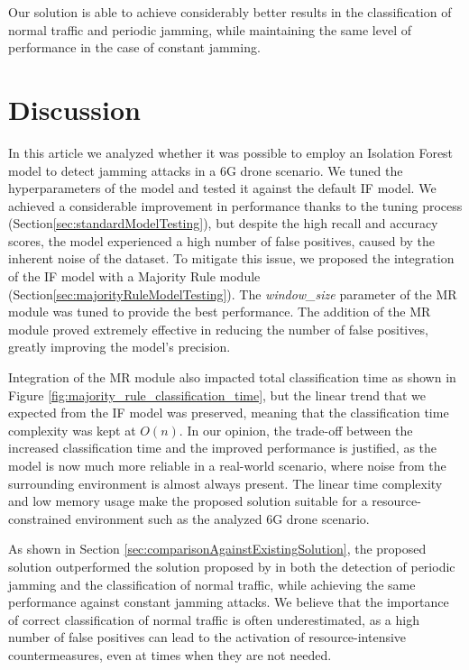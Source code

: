 \documentclass[futureinternet,article,submit,pdftex,moreauthors]{Definitions/mdpi}
\begin{document}
Our solution is able to achieve considerably better results in the classification of normal traffic and periodic jamming, while maintaining the same level of performance in the case of constant jamming.

\section{Discussion}


In this article we analyzed whether it was possible to employ an Isolation Forest model to detect jamming attacks in a 6G drone scenario. We tuned the hyperparameters of the model and tested it against the default IF model. 
We achieved a considerable improvement in performance thanks to the tuning process (Section\ref{sec:standardModelTesting}), but despite the high recall and accuracy scores, the model experienced a high number of false positives, caused by the inherent noise of the dataset. 
To mitigate this issue, we proposed the integration of the IF model with a Majority Rule module (Section\ref{sec:majorityRuleModelTesting}). The \textit{window\_size} parameter of the MR module was tuned to provide the best performance.
The addition of the MR module proved extremely effective in reducing the number of false positives, greatly improving the model's precision. 

Integration of the MR module also impacted total classification time as shown in Figure \ref{fig:majority_rule_classification_time}, but the linear trend \cite{IsolationForestLiu} that we expected from the IF model was preserved, meaning that the classification time complexity was kept at $O(n)$. 
In our opinion, the trade-off between the increased classification time and the improved performance is justified, as the model is now much more reliable in a real-world scenario, where noise from the surrounding environment is almost always present.
The linear time complexity and low memory usage make the proposed solution suitable for a resource-constrained environment such as the analyzed 6G drone scenario.

As shown in Section \ref{sec:comparisonAgainstExistingSolution}, the proposed solution outperformed the solution proposed by \cite{JammingDetectionIoT-Hussain} in both the detection of periodic jamming and the classification of normal traffic, while achieving the same performance against constant jamming attacks. 
We believe that the importance of correct classification of normal traffic is often underestimated, as a high number of false positives can lead to the activation of resource-intensive countermeasures, even at times when they are not needed. 
\end{document}
